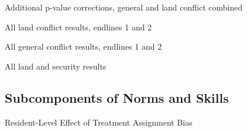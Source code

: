 \documentclass[10pt]{article}
\begin{document}
\begin{table}[H]
\caption{Additional p-value corrections, general and land conflict combined}
\begin{center}
\begin{adjustbox}{max width = \textwidth}

\end{adjustbox}
\end{center}
\end{table}


\begin{table}[H]
\caption{All land conflict results, endlines 1 and 2}
\begin{center}
\begin{adjustbox}{max width = \textwidth}

\end{adjustbox}
\end{center}
\end{table}

\begin{table}[H]
\caption{All general conflict results, endlines 1 and 2}
\begin{center}
\begin{adjustbox}{max width = \textwidth}

\end{adjustbox}
\end{center}
\end{table}

\begin{table}[H]
\caption{All land and security results}
\begin{center}
\begin{adjustbox}{max width = \textwidth}

\end{adjustbox}
\end{center}
\end{table}



\subsection{Subcomponents of Norms and Skills}

\begin{table}[H]
\caption{Resident-Level Effect of Treatment Assignment Bias}
\begin{center}
\begin{adjustbox}{max width = \textwidth}

\end{adjustbox}
\end{center}
\end{table}
\end{document}
